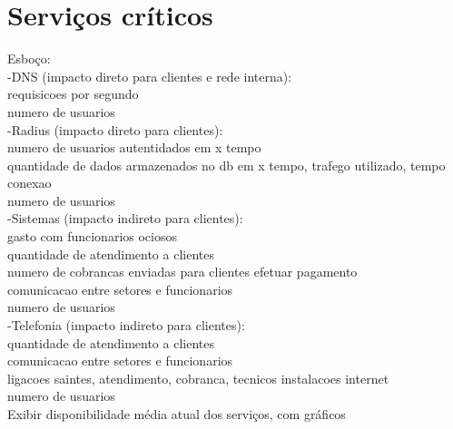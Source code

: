 \section{Serviços críticos}
\label{section:servcrit}

Esboço:\\
-DNS (impacto direto para clientes e rede interna): \\
requisicoes por segundo\\
numero de usuarios\\
-Radius (impacto direto para clientes): \\
numero de usuarios autentidados em x tempo\\
quantidade de dados armazenados no db em x tempo, trafego utilizado, tempo conexao\\
numero de usuarios\\
-Sistemas (impacto indireto para clientes): \\
gasto com funcionarios ociosos\\
quantidade de atendimento a clientes\\
numero de cobrancas enviadas para clientes efetuar pagamento\\
comunicacao entre setores e funcionarios\\
numero de usuarios\\
-Telefonia (impacto indireto para clientes): \\
quantidade de atendimento a clientes\\
comunicacao entre setores e funcionarios\\
ligacoes saintes, atendimento, cobranca, tecnicos instalacoes internet\\
numero de usuarios\\

Exibir disponibilidade média atual dos serviços, com gráficos

